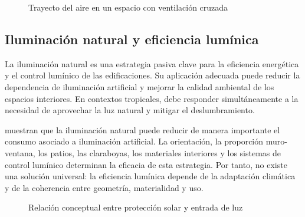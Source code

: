 \begin{figure}[htbp]\centering
\resizebox{0.96\textwidth}{!}{}
\caption{Trayecto del aire en un espacio con ventilación cruzada}
\end{figure}

\begin{textoDosTercios}

\subsection{Iluminación natural y eficiencia lumínica}

La iluminación natural es una estrategia pasiva clave para la eficiencia energética y el control lumínico de las edificaciones. Su aplicación adecuada puede reducir la dependencia de iluminación artificial y mejorar la calidad ambiental de los espacios interiores. En contextos tropicales, debe responder simultáneamente a la necesidad de aprovechar la luz natural y mitigar el deslumbramiento.

\textcite{patraReviewImpactDaylighting2024a} muestran que la iluminación natural puede reducir de manera importante el consumo asociado a iluminación artificial. La orientación, la proporción muro-ventana, los patios, las claraboyas, los materiales interiores y los sistemas de control lumínico determinan la eficacia de esta estrategia. Por tanto, no existe una solución universal: la eficiencia lumínica depende de la adaptación climática y de la coherencia entre geometría, materialidad y uso.

\end{textoDosTercios}


\begin{figure}[htbp]\centering
\resizebox{0.96\textwidth}{!}{}
\caption{Relación conceptual entre protección solar y entrada de luz}
\end{figure}

